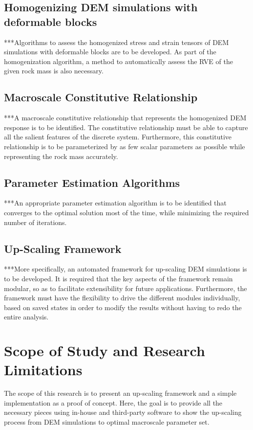 \subsection*{Homogenizing DEM simulations with deformable blocks}
***Algorithms to assess the homogenized stress and strain tensors of DEM simulations with deformable blocks are to be developed. As part of the homogenization algorithm, a method to automatically assess the RVE of the given rock mass is also necessary.

\subsection*{Macroscale Constitutive Relationship}
***A macroscale constitutive relationship that represents the homogenized DEM response is to be identified. The constitutive relationship must be able to capture all the salient features of the discrete system. Furthermore, this constitutive relationship is to be parameterized by as few scalar parameters as possible while representing the rock mass accurately.

\subsection*{Parameter Estimation Algorithms}
***An appropriate parameter estimation algorithm is to be identified that converges to the optimal solution most of the time, while minimizing the required number of iterations. 

\subsection*{Up-Scaling Framework}
***More specifically, an automated framework for up-scaling DEM simulations is to be developed. It is required that the key aspects of the framework remain modular, so as to facilitate extensibility for future applications. Furthermore, the framework must have the flexibility to drive the different modules individually, based on saved states in order to modify the results without having to redo the entire analysis.

\section{Scope of Study and Research Limitations}
The scope of this research is to present an up-scaling framework and a simple implementation as a proof of concept. Here, the goal is to provide all the necessary pieces using in-house and third-party software to show the up-scaling process from DEM simulations to optimal macroscale parameter set. 

